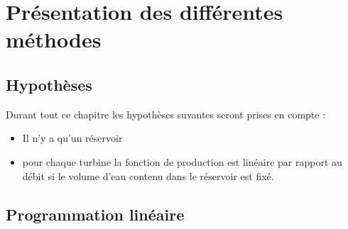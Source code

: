\documentclass[a4paper]{report}
\begin{document}
\tableofcontents
\chapter{Présentation des différentes méthodes}
\section{Hypothèses}
Durant tout ce chapitre les hypothèses suvantes seront prises en compte :\\
\begin{itemize}
  \item Il n'y a qu'un réservoir
  \item pour chaque turbine la fonction de production est linéaire par rapport au débit si le volume d'eau contenu dans le réservoir est fixé.
\end{itemize}
\section{Programmation linéaire}
\end{document}
